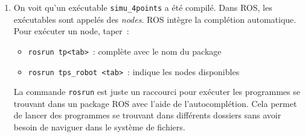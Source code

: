 \documentclass[12pt,a4paper]{article}
\begin{document}
\begin{enumerate}
\item On voit qu'un exécutable \texttt{simu\_4points} a été compilé. Dans ROS, les exécutables sont appelés des \emph{nodes}.
ROS intègre la complétion automatique. Pour exécuter un node, taper~:
\begin{itemize}
\item \texttt{rosrun tp<tab>}~: complète avec le nom du package
\item \texttt{rosrun tps\_robot <tab>}~: indique les nodes disponibles
\end{itemize}
La commande \texttt{rosrun} est juste un raccourci pour exécuter les programmes se trouvant dans un package ROS avec l'aide de l'autocomplétion. Cela permet de lancer des programmes se trouvant dans différents dossiers sans avoir besoin de naviguer dans le système de fichiers.


\end{enumerate}
\end{document}
